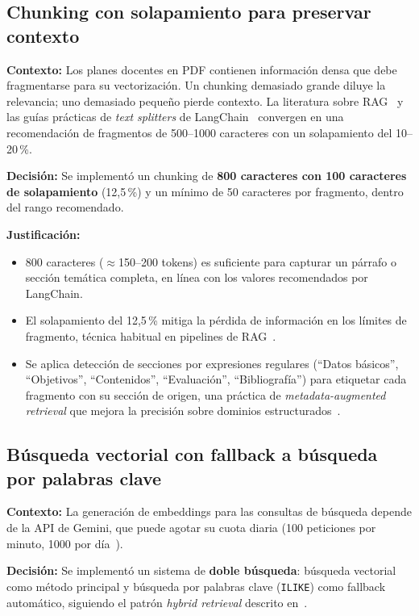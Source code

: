 \subsection{Chunking con solapamiento para preservar contexto}\label{subsec:dd-chunking}

\textbf{Contexto:} Los planes docentes en PDF contienen información densa que debe fragmentarse para su vectorización. Un chunking demasiado grande diluye la relevancia; uno demasiado pequeño pierde contexto. La literatura sobre RAG~\cite{lewis2020retrieval} y las guías prácticas de \textit{text splitters} de LangChain~\cite{langchainChunking} convergen en una recomendación de fragmentos de 500--1000 caracteres con un solapamiento del 10--20\,\%.

\textbf{Decisión:} Se implementó un chunking de \textbf{800 caracteres con 100 caracteres de solapamiento} (12,5\,\%) y un mínimo de 50 caracteres por fragmento, dentro del rango recomendado.

\textbf{Justificación:}
\begin{itemize}
    \item 800 caracteres ($\approx$150--200 tokens) es suficiente para capturar un párrafo o sección temática completa, en línea con los valores recomendados por LangChain.
    \item El solapamiento del 12,5\,\% mitiga la pérdida de información en los límites de fragmento, técnica habitual en pipelines de RAG~\cite{lewis2020retrieval,karpukhin2020dpr}.
    \item Se aplica detección de secciones por expresiones regulares (``Datos básicos'', ``Objetivos'', ``Contenidos'', ``Evaluación'', ``Bibliografía'') para etiquetar cada fragmento con su sección de origen, una práctica de \textit{metadata-augmented retrieval} que mejora la precisión sobre dominios estructurados~\cite{es2024ragas}.
\end{itemize}

\subsection{Búsqueda vectorial con fallback a búsqueda por palabras clave}\label{subsec:dd-fallback}

\textbf{Contexto:} La generación de embeddings para las consultas de búsqueda depende de la API de Gemini, que puede agotar su cuota diaria (100 peticiones por minuto, 1000 por día~\cite{geminiRateLimits}).

\textbf{Decisión:} Se implementó un sistema de \textbf{doble búsqueda}: búsqueda vectorial como método principal y búsqueda por palabras clave (\texttt{ILIKE}) como fallback automático, siguiendo el patrón \textit{hybrid retrieval} descrito en~\cite{karpukhin2020dpr}.

